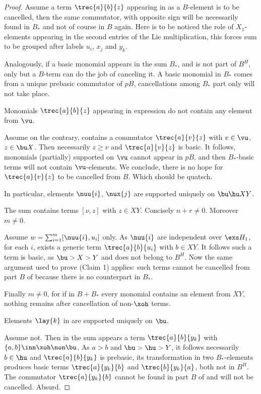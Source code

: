 \begin{proof}
Assume a term $\trec{a}{b}{z}$ appearing in  as a $B$-element is to be cancelled,
then the same commutator, with opposite sign will be necessarily found in $B_{*}$ and not of course in $B$ again. Here is to be noticed the role of $X_{1}$-elements appearing in the second entries
of the Lie multiplication, this forces sum  to be
grouped after labels $u_{i}$, $x_{j}$ and $y_{k}$.\label{wahnsinn1}

Analogously, if a basic monomial appears in the sum $B_{*}$, and is not part of $B^{H}$, only but a $B$-term can do the job of canceling it. A basic monomial in $B_{*}$ comes from a unique prebasic commutator of $pB$,
cancellations among $B_{*}$ part only will not take place.\label{wahnsinn2}

\begin{itemize}
Monomials $\trec{a}{b}{z}$ appearing in expression  do not contain any element from $\vu$.
\end{itemize}
Assume on the contrary,  contains a commutator $\trec{a}{v}{z}$ with $v\in\vu$, $z\in\bu X$.
Then necessarily $z\geq v$ and $\trec{a}{v}{z}$ is basic. It follows, monomials (partially) supported on $\vu$
cannot appear in $pB$, and then $B_{*}$-basic terms will not contain $\vu$-elements.
We conclude, there is no hope for  $\trec{a}{v}{z}$ to be cancelled from $B$. Which should be quatsch.

In particular, elements $\nuu{i}$, $\nux{j}$ are supported uniquely on $\bu\hu XY$.

\begin{itemize}
The sum  contains terms $[\nu, z]$ with $z\in XY$.
Concisely $n+r\neq0$. Moreover $m\neq0$.
\end{itemize}
Assume $w=\sum_{i=1}^m[\nuu{i}, u_i]$ only. As $\nuu{i}$ are independent over $\exs H_1$, for each $i$, exists a generic term $\trec{a}{b}{u_i}$ with $b\in XY$. It follows such a  term
is basic, as $\bu>X>Y$ and does not belong to $B^{H}$. Now the same
argument used to prove (Claim 1) applies: such terms cannot be cancelled from part $B$ of 
because there is no counterpart in $B_{*}$.

Finally $m\neq0$, for if in $B+B_*$ every monomial contains an element from $XY$, nothing
remains after cancellation of non-$\xoh$ terms. 

\begin{itemize}
Elements $\lay{k}$ in  are supported uniquely on $\bu$.
\end{itemize}
Assume not. Then in the sum appears a term $\trec{a}{b}{y_k}$ with $\{a,b\}\inn\xoh\non\bu$.
As $a>b$ and $\bu>\hu>Y$, it follows necessarily
$b\in\hu$ and $\trec{a}{b}{y_k}$ is prebasic, its transformation in two $B_*$-elements produces basic terms
$\trec{a}{y_k}{b}$ and $\trec{b}{y_k}{a}$, both not in $B^{H}$.
The commutator $\trec{a}{y_k}{b}$ cannot be found in part $B$ of  and will not be cancelled. Absurd.


\end{proof}
